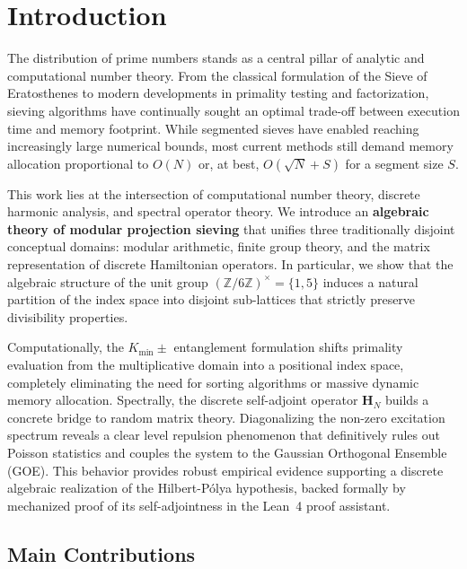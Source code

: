 \documentclass{article}
\numberwithin{equation}{section}
\theoremstyle{plain}
\theoremstyle{definition}
\begin{document}
\maketitle

\section{Introduction}

The distribution of prime numbers stands as a central pillar of analytic and computational number theory. From the classical formulation of the Sieve of Eratosthenes to modern developments in primality testing and factorization, sieving algorithms have continually sought an optimal trade-off between execution time and memory footprint. While segmented sieves \cite{Sorenson1998, Galway2004} have enabled reaching increasingly large numerical bounds, most current methods still demand memory allocation proportional to $O(N)$ or, at best, $O(\sqrt{N}+S)$ for a segment size $S$.

This work lies at the intersection of computational number theory, discrete harmonic analysis, and spectral operator theory. We introduce an \textbf{algebraic theory of modular projection sieving} that unifies three traditionally disjoint conceptual domains: modular arithmetic, finite group theory, and the matrix representation of discrete Hamiltonian operators. In particular, we show that the algebraic structure of the unit group $(\mathbb{Z}/6\mathbb{Z})^\times = \{1,5\}$ induces a natural partition of the index space into disjoint sub-lattices that strictly preserve divisibility properties.

Computationally, the $K_{\min}\pm$ entanglement formulation shifts primality evaluation from the multiplicative domain into a positional index space, completely eliminating the need for sorting algorithms or massive dynamic memory allocation. Spectrally, the discrete self-adjoint operator $\mathbf{H}_N$ builds a concrete bridge to random matrix theory. Diagonalizing the non-zero excitation spectrum reveals a clear level repulsion phenomenon that definitively rules out Poisson statistics and couples the system to the Gaussian Orthogonal Ensemble (GOE). This behavior provides robust empirical evidence supporting a discrete algebraic realization of the Hilbert-Pólya hypothesis, backed formally by mechanized proof of its self-adjointness in the Lean~4 proof assistant.

\subsection*{Main Contributions}
\end{document}

